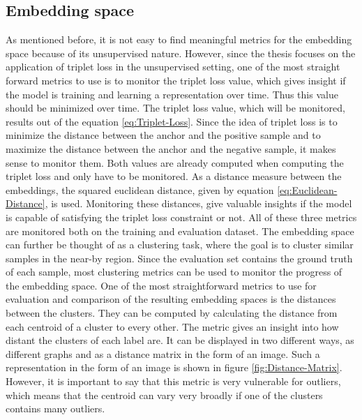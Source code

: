 \subsection{Embedding space}
\label{sub:Metrics-Embedding-Space}
As mentioned before, it is not easy to find meaningful metrics for the embedding space because of its unsupervised nature. However, since the thesis focuses on the application of triplet loss in the unsupervised setting, one of the most straight forward metrics to use is to monitor the triplet loss value, which gives insight if the model is training and learning a representation over time. Thus this value should be minimized over time. The triplet loss value, which will be monitored, results out of the equation \ref{eq:Triplet-Loss}. Since the idea of triplet loss is to minimize the distance between the anchor and the positive sample and to maximize the distance between the anchor and the negative sample, it makes sense to monitor them. Both values are already computed when computing the triplet loss and only have to be monitored. As a distance measure between the embeddings, the squared euclidean distance, given by equation \ref{eq:Euclidean-Distance}, is used. Monitoring these distances, give valuable insights if the model is capable of satisfying the triplet loss constraint or not. All of these three metrics are monitored both on the training and evaluation dataset.
\newline
\newline
The embedding space can further be thought of as a clustering task, where the goal is to cluster similar samples in the near-by region. Since the evaluation set contains the ground truth of each sample, most clustering metrics can be used to monitor the progress of the embedding space. 
\newline
\newline
One of the most straightforward metrics to use for evaluation and comparison of the resulting embedding spaces is the distances between the clusters. They can be computed by calculating the distance from each centroid of a cluster to every other. The metric gives an insight into how distant the clusters of each label are. It can be displayed in two different ways, as different graphs and as a distance matrix in the form of an image. Such a representation in the form of an image is shown in figure \ref{fig:Distance-Matrix}. However, it is important to say that this metric is very vulnerable for outliers, which means that the centroid can vary very broadly if one of the clusters contains many outliers.
